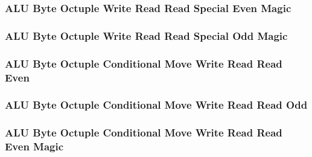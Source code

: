 

\subsubsection[{\small ALU Byte Octuple Write Read Read Special Even Magic}]{ALU Byte Octuple Write Read Read Special Even Magic} \label{sec:format-ALU-BOWRRSE.M}



\subsubsection[{\small ALU Byte Octuple Write Read Read Special Odd Magic}]{ALU Byte Octuple Write Read Read Special Odd Magic} \label{sec:format-ALU-BOWRRSO.M}



\subsubsection[{\small ALU Byte Octuple Conditional Move Write Read Read Even}]{ALU Byte Octuple Conditional Move Write Read Read Even} \label{sec:format-ALU-BOCMWRRE}



\subsubsection[{\small ALU Byte Octuple Conditional Move Write Read Read Odd}]{ALU Byte Octuple Conditional Move Write Read Read Odd} \label{sec:format-ALU-BOCMWRRO}



\subsubsection[{\small ALU Byte Octuple Conditional Move Write Read Read Even Magic}]{ALU Byte Octuple Conditional Move Write Read Read Even Magic} \label{sec:format-ALU-BOCMWRRE.M}

